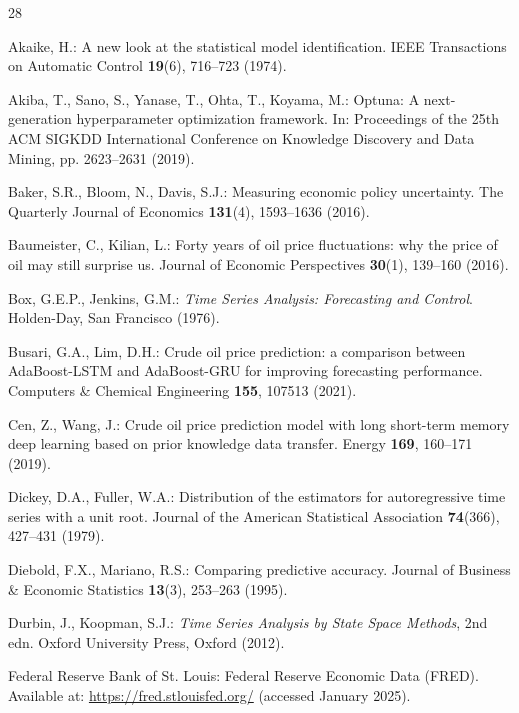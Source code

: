 \documentclass[pdflatex,sn-mathphys-num]{sn-jnl}%
\theoremstyle{thmstyleone}%
\theoremstyle{thmstyletwo}%
\theoremstyle{thmstylethree}%
\begin{document}
\begin{thebibliography}{28}

Akaike, H.: A new look at the statistical model identification. IEEE Transactions on Automatic Control \textbf{19}(6), 716--723 (1974).

Akiba, T., Sano, S., Yanase, T., Ohta, T., Koyama, M.: Optuna: A next-generation hyperparameter optimization framework. In: Proceedings of the 25th ACM SIGKDD International Conference on Knowledge Discovery and Data Mining, pp. 2623--2631 (2019).

Baker, S.R., Bloom, N., Davis, S.J.: Measuring economic policy uncertainty. The Quarterly Journal of Economics \textbf{131}(4), 1593--1636 (2016).

Baumeister, C., Kilian, L.: Forty years of oil price fluctuations: why the price of oil may still surprise us. Journal of Economic Perspectives \textbf{30}(1), 139--160 (2016).

Box, G.E.P., Jenkins, G.M.: \textit{Time Series Analysis: Forecasting and Control}. Holden-Day, San Francisco (1976).

Busari, G.A., Lim, D.H.: Crude oil price prediction: a comparison between AdaBoost-LSTM and AdaBoost-GRU for improving forecasting performance. Computers \& Chemical Engineering \textbf{155}, 107513 (2021).

Cen, Z., Wang, J.: Crude oil price prediction model with long short-term memory deep learning based on prior knowledge data transfer. Energy \textbf{169}, 160--171 (2019).

Dickey, D.A., Fuller, W.A.: Distribution of the estimators for autoregressive time series with a unit root. Journal of the American Statistical Association \textbf{74}(366), 427--431 (1979).

Diebold, F.X., Mariano, R.S.: Comparing predictive accuracy. Journal of Business \& Economic Statistics \textbf{13}(3), 253--263 (1995).

Durbin, J., Koopman, S.J.: \textit{Time Series Analysis by State Space Methods}, 2nd edn. Oxford University Press, Oxford (2012).

Federal Reserve Bank of St. Louis: Federal Reserve Economic Data (FRED). Available at: \url{https://fred.stlouisfed.org/} (accessed January 2025).


\end{thebibliography}
\end{document}
